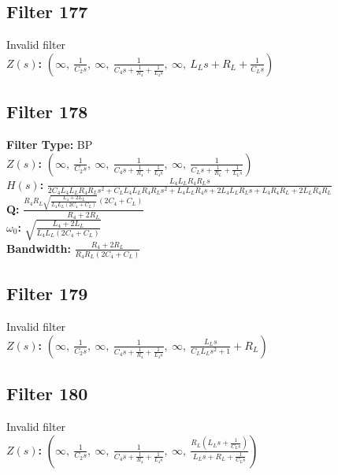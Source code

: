 \documentclass{article}
\begin{document}
\subsection*{Filter 177}
Invalid filter \\ 
\textbf{$Z(s)$:} $\left( \infty, \  \frac{1}{C_{2} s}, \  \infty, \  \frac{1}{C_{4} s + \frac{1}{R_{4}} + \frac{1}{L_{4} s}}, \  \infty, \  L_{L} s + R_{L} + \frac{1}{C_{L} s}\right)$ \\ 
\subsection*{Filter 178}
\textbf{Filter Type:} BP \\ 
\textbf{$Z(s)$:} $\left( \infty, \  \frac{1}{C_{2} s}, \  \infty, \  \frac{1}{C_{4} s + \frac{1}{R_{4}} + \frac{1}{L_{4} s}}, \  \infty, \  \frac{1}{C_{L} s + \frac{1}{R_{L}} + \frac{1}{L_{L} s}}\right)$ \\ 
\textbf{$H(s)$:} $\frac{L_{4} L_{L} R_{4} R_{L} s}{2 C_{4} L_{4} L_{L} R_{4} R_{L} s^{2} + C_{L} L_{4} L_{L} R_{4} R_{L} s^{2} + L_{4} L_{L} R_{4} s + 2 L_{4} L_{L} R_{L} s + L_{4} R_{4} R_{L} + 2 L_{L} R_{4} R_{L}}$ \\ 
\textbf{Q:} $\frac{R_{4} R_{L} \sqrt{\frac{L_{4} + 2 L_{L}}{L_{4} L_{L} \left(2 C_{4} + C_{L}\right)}} \left(2 C_{4} + C_{L}\right)}{R_{4} + 2 R_{L}}$ \\ 
\textbf{$\omega_0$:} $\sqrt{\frac{L_{4} + 2 L_{L}}{L_{4} L_{L} \left(2 C_{4} + C_{L}\right)}}$ \\ 
\textbf{Bandwidth:} $\frac{R_{4} + 2 R_{L}}{R_{4} R_{L} \left(2 C_{4} + C_{L}\right)}$ \\ 
\subsection*{Filter 179}
Invalid filter \\ 
\textbf{$Z(s)$:} $\left( \infty, \  \frac{1}{C_{2} s}, \  \infty, \  \frac{1}{C_{4} s + \frac{1}{R_{4}} + \frac{1}{L_{4} s}}, \  \infty, \  \frac{L_{L} s}{C_{L} L_{L} s^{2} + 1} + R_{L}\right)$ \\ 
\subsection*{Filter 180}
Invalid filter \\ 
\textbf{$Z(s)$:} $\left( \infty, \  \frac{1}{C_{2} s}, \  \infty, \  \frac{1}{C_{4} s + \frac{1}{R_{4}} + \frac{1}{L_{4} s}}, \  \infty, \  \frac{R_{L} \left(L_{L} s + \frac{1}{C_{L} s}\right)}{L_{L} s + R_{L} + \frac{1}{C_{L} s}}\right)$ \\ 
\end{document}
